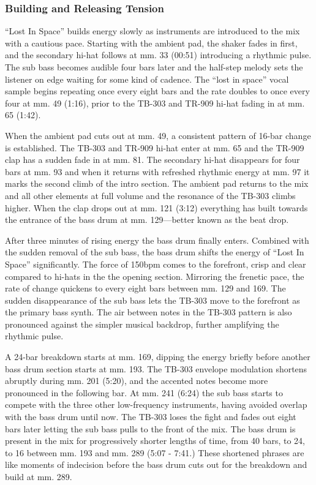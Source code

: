 \documentclass[12pt,twoside]{reedthesis}
\begin{document}
\subsubsection{Building and Releasing Tension}
``Lost In Space'' builds energy slowly as instruments are introduced to the mix with a cautious pace. Starting with the ambient pad, the shaker fades in first, and the secondary hi-hat follows at mm. 33 (00:51) introducing a rhythmic pulse. The sub bass becomes audible four bars later and the half-step melody sets the listener on edge waiting for some kind of cadence. The ``lost in space'' vocal sample begins repeating once every eight bars and the rate doubles to once every four at mm. 49 (1:16), prior to the TB-303 and TR-909 hi-hat fading in at mm. 65 (1:42).

When the ambient pad cuts out at mm. 49, a consistent pattern of 16-bar change is established. The TB-303 and TR-909 hi-hat enter at mm. 65 and the TR-909 clap has a sudden fade in at mm. 81. The secondary hi-hat disappears for four bars at mm. 93 and when it returns with refreshed rhythmic energy at mm. 97 it marks the second climb of the intro section. The ambient pad returns to the mix and all other elements at full volume and the resonance of the TB-303 climbs higher. When the clap drops out at mm. 121 (3:12) everything has built towards the entrance of the bass drum at mm. 129---better known as the beat drop.

After three minutes of rising energy the bass drum finally enters. Combined with the sudden removal of the sub bass, the bass drum shifts the energy of ``Lost In Space'' significantly. The force of 150bpm comes to the forefront, crisp and clear compared to hi-hats in the the opening section. Mirroring the frenetic pace, the rate of change quickens to every eight bars between mm. 129 and 169. The sudden disappearance of the sub bass lets the TB-303 move to the forefront as the primary bass synth. The air between notes in the TB-303 pattern is also pronounced against the simpler musical backdrop, further amplifying the rhythmic pulse. 

A 24-bar breakdown starts at mm. 169, dipping the energy briefly before another bass drum section starts at mm. 193. The TB-303 envelope modulation shortens abruptly during mm. 201 (5:20), and the accented notes become more pronounced in the following bar. At mm. 241 (6:24) the sub bass starts to compete with the three other low-frequency instruments, having avoided overlap with the bass drum until now. The TB-303 loses the fight and fades out eight bars later letting the sub bass pulls to the front of the mix. The bass drum is present in the mix for progressively shorter lengths of time, from 40 bars, to 24, to 16 between mm. 193 and mm. 289 (5:07 - 7:41.) These shortened phrases are like moments of indecision before the bass drum cuts out for the breakdown and build at mm. 289. 
\end{document}
